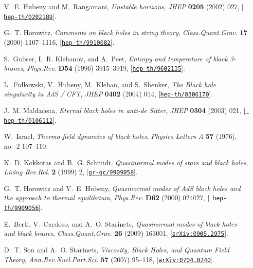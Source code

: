 \documentclass[12pt,a4paper]{article}
\begin{document}
\begin{thebibliography}{100}
V.~E. Hubeny and M.~Rangamani, {\it {Unstable horizons}},  {\em JHEP} {\bf
  0205} (2002) 027, [\href{http://xxx.lanl.gov/abs/hep-th/0202189}{{\tt
  hep-th/0202189}}].

G.~T. Horowitz, {\it {Comments on black holes in string theory}},  {\em
  Class.Quant.Grav.} {\bf 17} (2000) 1107--1116,
  [\href{http://xxx.lanl.gov/abs/hep-th/9910082}{{\tt hep-th/9910082}}].

S.~Gubser, I.~R. Klebanov, and A.~Peet, {\it {Entropy and temperature of black
  3-branes}},  {\em Phys.Rev.} {\bf D54} (1996) 3915--3919,
  [\href{http://xxx.lanl.gov/abs/hep-th/9602135}{{\tt hep-th/9602135}}].

L.~Fidkowski, V.~Hubeny, M.~Kleban, and S.~Shenker, {\it {The Black hole
  singularity in AdS / CFT}},  {\em JHEP} {\bf 0402} (2004) 014,
  [\href{http://xxx.lanl.gov/abs/hep-th/0306170}{{\tt hep-th/0306170}}].

J.~M. Maldacena, {\it {Eternal black holes in anti-de Sitter}},  {\em JHEP}
  {\bf 0304} (2003) 021, [\href{http://xxx.lanl.gov/abs/hep-th/0106112}{{\tt
  hep-th/0106112}}].

W.~Israel, {\it Thermo-field dynamics of black holes},  {\em Physics Letters A}
  {\bf 57} (1976), no.~2 107--110.

K.~D. Kokkotas and B.~G. Schmidt, {\it {Quasinormal modes of stars and black
  holes}},  {\em Living Rev.Rel.} {\bf 2} (1999) 2,
  [\href{http://xxx.lanl.gov/abs/gr-qc/9909058}{{\tt gr-qc/9909058}}].

G.~T. Horowitz and V.~E. Hubeny, {\it {Quasinormal modes of AdS black holes and
  the approach to thermal equilibrium}},  {\em Phys.Rev.} {\bf D62} (2000)
  024027, [\href{http://xxx.lanl.gov/abs/hep-th/9909056}{{\tt
  hep-th/9909056}}].

E.~Berti, V.~Cardoso, and A.~O. Starinets, {\it {Quasinormal modes of black
  holes and black branes}},  {\em Class.Quant.Grav.} {\bf 26} (2009) 163001,
  [\href{http://xxx.lanl.gov/abs/0905.2975}{{\tt arXiv:0905.2975}}].

D.~T. Son and A.~O. Starinets, {\it {Viscosity, Black Holes, and Quantum Field
  Theory}},  {\em Ann.Rev.Nucl.Part.Sci.} {\bf 57} (2007) 95--118,
  [\href{http://xxx.lanl.gov/abs/0704.0240}{{\tt arXiv:0704.0240}}].


\end{thebibliography}
\end{document}
